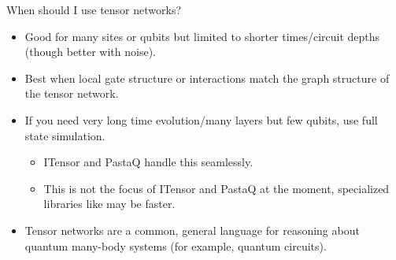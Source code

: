 \begin{frame}{When should I use tensor networks?}

\begin{itemize}[<+->]

  \item Good for many sites or qubits but limited to shorter times/circuit depths (though better with noise).
  \item Best when local gate structure or interactions match the graph structure of the tensor network.
  \item If you need very long time evolution/many layers but few qubits, use full state simulation.
    
  \begin{itemize}[<+->]

    \item ITensor and PastaQ handle this seamlessly.
    \item This is not the focus of ITensor and PastaQ at the moment, specialized libraries like  may be faster.

  \end{itemize}

  \item Tensor networks are a common, general language for reasoning about quantum many-body systems (for example, quantum circuits).

\end{itemize}

\end{frame}
